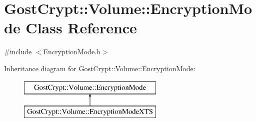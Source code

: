 \hypertarget{class_gost_crypt_1_1_volume_1_1_encryption_mode}{}\section{Gost\+Crypt\+:\+:Volume\+:\+:Encryption\+Mode Class Reference}
\label{class_gost_crypt_1_1_volume_1_1_encryption_mode}


{\ttfamily \#include $<$Encryption\+Mode.\+h$>$}

Inheritance diagram for Gost\+Crypt\+:\+:Volume\+:\+:Encryption\+Mode\+:\begin{figure}[H]
\begin{center}
\leavevmode
\includegraphics[height=2.000000cm]{class_gost_crypt_1_1_volume_1_1_encryption_mode}
\end{center}
\end{figure}
